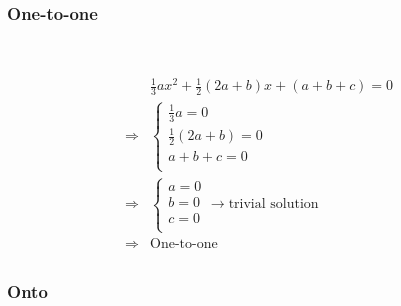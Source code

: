 \documentclass{article}
\begin{document}
\subsubsection{One-to-one}

~

\begin{equation*}
\begin{split}
&\frac{1}{3}ax^2+\frac{1}{2}(2a+b)x+(a+b+c)=0\\
\Rightarrow &\begin{cases}
\frac{1}{3}a=0\\
\frac{1}{2}(2a+b)=0\\
a+b+c=0\\
\end{cases}\\
\Rightarrow &\begin{cases}
a=0\\
b=0\\
c=0\\
\end{cases}\rightarrow \text{trivial solution}\\
\Rightarrow &\text{One-to-one}\\
\end{split}
\end{equation*}

\subsubsection{Onto}

~
\end{document}
